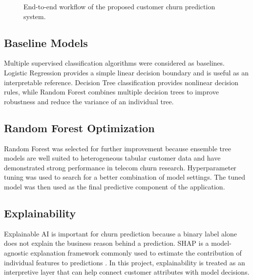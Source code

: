 \documentclass[conference]{IEEEtran}
\begin{document}
\begin{figure}[H]
\centering
{}
\caption{End-to-end workflow of the proposed customer churn prediction system.}
\end{figure}

\subsection{Baseline Models}
Multiple supervised classification algorithms were considered as baselines. Logistic Regression provides a simple linear decision boundary and is useful as an interpretable reference. Decision Tree classification provides nonlinear decision rules, while Random Forest combines multiple decision trees to improve robustness and reduce the variance of an individual tree.

\subsection{Random Forest Optimization}
Random Forest was selected for further improvement because ensemble tree models are well suited to heterogeneous tabular customer data and have demonstrated strong performance in telecom churn research. Hyperparameter tuning was used to search for a better combination of model settings. The tuned model was then used as the final predictive component of the application.

\subsection{Explainability}
Explainable AI is important for churn prediction because a binary label alone does not explain the business reason behind a prediction. SHAP is a model-agnostic explanation framework commonly used to estimate the contribution of individual features to predictions \cite{lundberg2017}. In this project, explainability is treated as an interpretive layer that can help connect customer attributes with model decisions.
\end{document}
